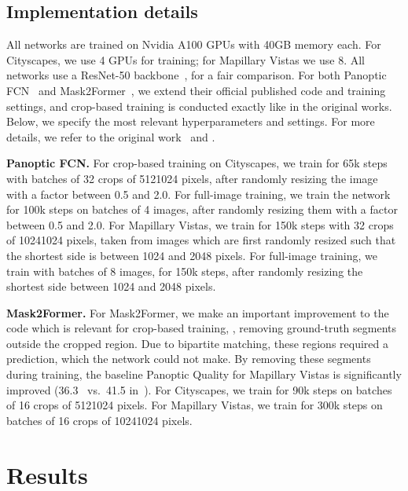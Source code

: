 \documentclass[10pt,twocolumn,letterpaper]{article}
\begin{document}
\subsection{Implementation details}
\label{sec:experiments:impl_details}
All networks are trained on Nvidia A100 GPUs with 40GB memory each. For Cityscapes, we use 4 GPUs for training; for Mapillary Vistas we use 8. All networks use a ResNet-50 backbone~\cite{he2016resnet}, for a fair comparison. For both Panoptic FCN~\cite{li2021panopticfcn} and Mask2Former~\cite{cheng2021mask2former}, we extend their official published code and training settings, and crop-based training is conducted exactly like in the original works. Below, we specify the most relevant hyperparameters and settings. For more details, we refer to the original work~\cite{cheng2021mask2former,li2021panopticfcn} and .

\textbf{Panoptic FCN.} For crop-based training on Cityscapes, we train for 65k steps with batches of 32 crops of 5121024 pixels, after randomly resizing the image with a factor between 0.5 and 2.0. For full-image training, we train the network for 100k steps on batches of 4 images, after randomly resizing them with a factor between 0.5 and 2.0. For Mapillary Vistas, we train for 150k steps with 32 crops of 10241024 pixels, taken from images which are first randomly resized such that the shortest side is between 1024 and 2048 pixels. For full-image training, we train with batches of 8 images, for 150k steps, after randomly resizing the shortest side between 1024 and 2048 pixels.

\textbf{Mask2Former.} For Mask2Former, we make an important improvement to the code which is relevant for crop-based training, \ie, removing ground-truth segments outside the cropped region. Due to bipartite matching, these regions required a prediction, which the network could not make. By removing these segments during training, the baseline Panoptic Quality for Mapillary Vistas is significantly improved (36.3~\cite{cheng2021mask2former} vs.~41.5 in~). For Cityscapes, we train for 90k steps on batches of 16 crops of 5121024 pixels. For Mapillary Vistas, we train for 300k steps on batches of 16 crops of 10241024 pixels. 
 \section{Results}
\label{sec:results}
\end{document}
